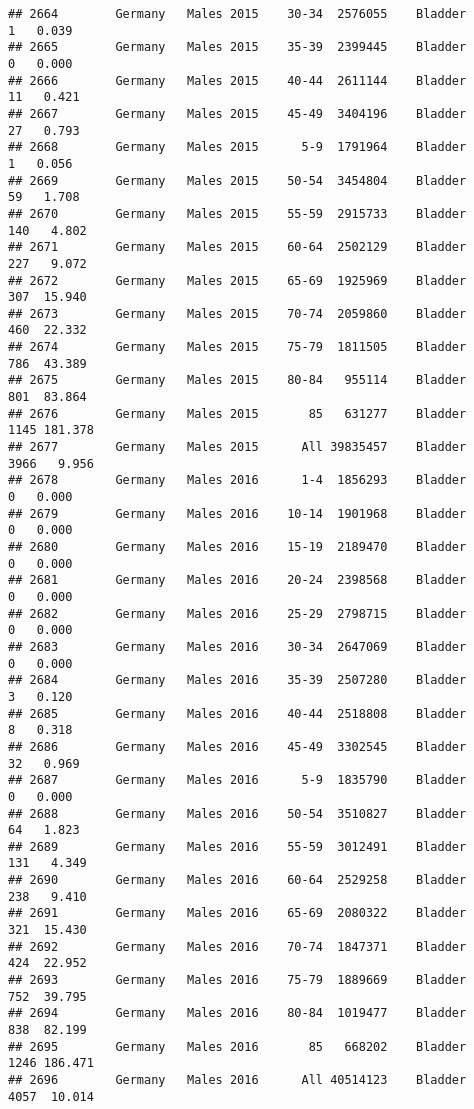 \documentclass[
]{article}
\begin{document}
\begin{verbatim}
## 2664        Germany   Males 2015    30-34  2576055    Bladder      1   0.039
## 2665        Germany   Males 2015    35-39  2399445    Bladder      0   0.000
## 2666        Germany   Males 2015    40-44  2611144    Bladder     11   0.421
## 2667        Germany   Males 2015    45-49  3404196    Bladder     27   0.793
## 2668        Germany   Males 2015      5-9  1791964    Bladder      1   0.056
## 2669        Germany   Males 2015    50-54  3454804    Bladder     59   1.708
## 2670        Germany   Males 2015    55-59  2915733    Bladder    140   4.802
## 2671        Germany   Males 2015    60-64  2502129    Bladder    227   9.072
## 2672        Germany   Males 2015    65-69  1925969    Bladder    307  15.940
## 2673        Germany   Males 2015    70-74  2059860    Bladder    460  22.332
## 2674        Germany   Males 2015    75-79  1811505    Bladder    786  43.389
## 2675        Germany   Males 2015    80-84   955114    Bladder    801  83.864
## 2676        Germany   Males 2015       85   631277    Bladder   1145 181.378
## 2677        Germany   Males 2015      All 39835457    Bladder   3966   9.956
## 2678        Germany   Males 2016      1-4  1856293    Bladder      0   0.000
## 2679        Germany   Males 2016    10-14  1901968    Bladder      0   0.000
## 2680        Germany   Males 2016    15-19  2189470    Bladder      0   0.000
## 2681        Germany   Males 2016    20-24  2398568    Bladder      0   0.000
## 2682        Germany   Males 2016    25-29  2798715    Bladder      0   0.000
## 2683        Germany   Males 2016    30-34  2647069    Bladder      0   0.000
## 2684        Germany   Males 2016    35-39  2507280    Bladder      3   0.120
## 2685        Germany   Males 2016    40-44  2518808    Bladder      8   0.318
## 2686        Germany   Males 2016    45-49  3302545    Bladder     32   0.969
## 2687        Germany   Males 2016      5-9  1835790    Bladder      0   0.000
## 2688        Germany   Males 2016    50-54  3510827    Bladder     64   1.823
## 2689        Germany   Males 2016    55-59  3012491    Bladder    131   4.349
## 2690        Germany   Males 2016    60-64  2529258    Bladder    238   9.410
## 2691        Germany   Males 2016    65-69  2080322    Bladder    321  15.430
## 2692        Germany   Males 2016    70-74  1847371    Bladder    424  22.952
## 2693        Germany   Males 2016    75-79  1889669    Bladder    752  39.795
## 2694        Germany   Males 2016    80-84  1019477    Bladder    838  82.199
## 2695        Germany   Males 2016       85   668202    Bladder   1246 186.471
## 2696        Germany   Males 2016      All 40514123    Bladder   4057  10.014

\end{verbatim}
\end{document}
